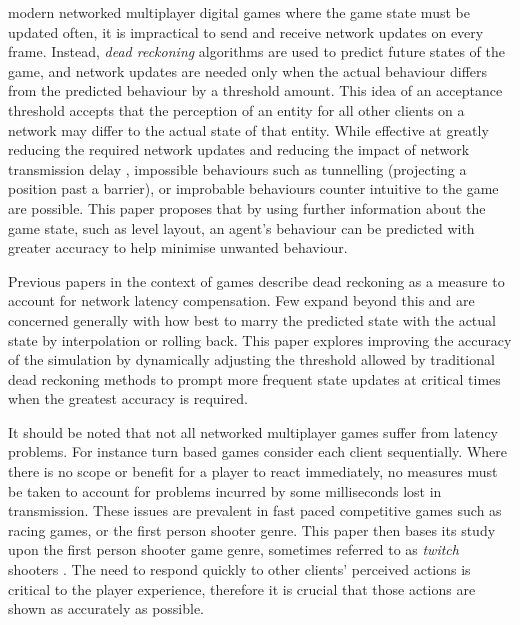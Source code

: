 \documentclass[journal]{IEEEtran}
\begin{document}
 modern networked multiplayer digital games where the game state must be updated often, it is impractical to send and receive network updates on every frame. Instead, \textit{dead reckoning} algorithms are used to predict future states of the game, and network updates are needed only when the actual behaviour differs from the predicted behaviour by a threshold amount. This idea of an acceptance threshold accepts that the perception of an entity for all other clients on a network may differ to the actual state of that entity. While effective at greatly reducing the required network updates and reducing the impact of network transmission delay \cite{pantel2002suitability}, impossible behaviours such as tunnelling (projecting a position past a barrier), or improbable behaviours counter intuitive to the game are possible. This paper proposes that by using further information about the game state, such as level layout, an agent's behaviour can be predicted with greater accuracy to help minimise unwanted behaviour.

Previous papers in the context of games describe dead reckoning as a measure to account for network latency compensation. Few expand beyond this and are concerned generally with how best to marry the predicted state with the actual state by interpolation or rolling back. This paper explores improving the accuracy of the simulation by dynamically adjusting the threshold allowed by traditional dead reckoning methods to prompt more frequent state updates at critical times when the greatest accuracy is required.

It should be noted that not all networked multiplayer games suffer from latency problems. For instance turn based games consider each client sequentially. Where there is no scope or benefit for a player to react immediately, no measures must be taken to account for problems incurred by some milliseconds lost in transmission. These issues are prevalent in fast paced competitive games such as racing games, or the first person shooter genre. This paper then bases its study upon the first person shooter game genre, sometimes referred to as \textit{twitch} shooters \cite{lee2015outatime}. The need to respond quickly to other clients' perceived actions is critical to the player experience, therefore it is crucial that those actions are shown as accurately as possible.
\end{document}

